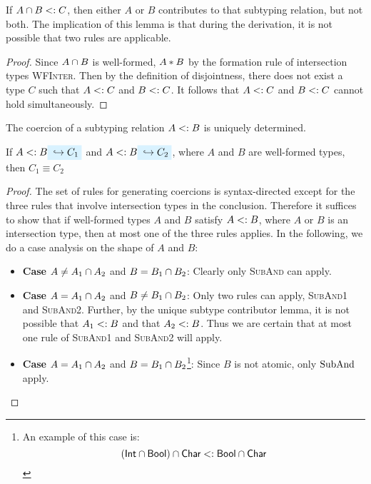 \documentclass[preprint]{sigplanconf}
\begin{document}
If $A \cap B <: C$, then either $A$ or $B$ contributes to that subtyping relation, but not both. The implication of this lemma is that during the derivation, it is not possible that two rules are applicable.

\newcommand{\wfinterlabel}{\textsc{WFInter}}

\begin{proof}
Since $A \cap B$ is well-formed, $A * B$ by the formation rule of intersection types \wfinterlabel. Then by the definition of disjointness, there does not exist a type $C$ such that $A <: C$ and $B <: C$. It follows that $A <: C$ and $B <: C$ cannot hold simultaneously.
\end{proof}

The coercion of a subtyping relation $A <: B$ is uniquely determined.

\begin{lemma} \label{unique-coercion}
If $A \subtype B \yields {C_1}$ and $A \subtype B \yields {C_2}$, where $A$ and $B$ are well-formed types, then $C_1 \equiv C_2$
\end{lemma}

\begin{proof}
The set of rules for generating coercions is syntax-directed except for the three rules that involve intersection types in the conclusion. Therefore it suffices to show that if well-formed types $A$ and $B$ satisfy $A <: B$, where $A$ or $B$ is an intersection type, then at most one of the three rules applies. In the following, we do a case analysis on the shape of $A$ and $B$:

\begin{itemize}
  \item \textbf{Case} $A \neq A_1 \cap A_2$ and $B = B_1 \cap B_2$: Clearly only \textsc{SubAnd} can apply.
  \item \textbf{Case} $A = A_1 \cap A_2$ and $B \neq B_1 \cap B_2$: Only two rules can apply, \textsc{SubAnd1} and \textsc{SubAnd2}. Further, by the unique subtype contributor lemma, it is not possible that $A_1 <: B$ and that $A_2 <: B$. Thus we are certain that at most one rule of \textsc{SubAnd1} and \textsc{SubAnd2} will apply.
  \item \textbf{Case} $A = A_1 \cap A_2$ and $B = B_1 \cap B_2$\footnote{An example of this case is:
    \[ (\textsf{Int} \cap \textsf{Bool}) \cap \textsf{Char} <: \textsf{Bool} \cap \textsf{Char} \]}: Since $B$ is not atomic, only $\text{Sub}\text{And}$ apply.

\end{itemize}

\end{proof}
\end{document}

